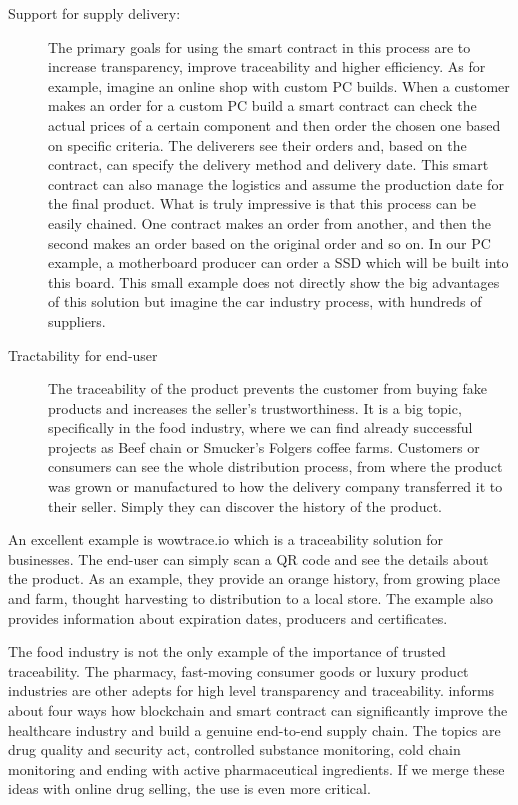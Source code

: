 \documentclass[thesis=M,english]{FITthesis}[2019/12/23]
\begin{document}
\begin{description}

\item[Support for supply delivery:]
The primary goals for using the smart contract in this process are to increase transparency, improve traceability and higher efficiency. As for example, imagine an online shop with custom PC builds. When a customer makes an order for a custom PC build a smart contract can check the actual prices of a certain component and then order the chosen one based on specific criteria. The deliverers see their orders and, based on the contract, can specify the delivery method and delivery date. This smart contract can also manage the logistics and assume the production date for the final product. What is truly impressive is that this process can be easily chained. One contract makes an order from another, and then the second makes an order based on the original order and so on. In our PC example, a motherboard producer can order a SSD which will be built into this board. This small example does not directly show the big advantages of this solution but imagine the car industry process, with hundreds of suppliers.\cite{Angwei2017}

\item[Tractability for end-user]
The traceability of the product prevents the customer from buying fake products and increases the seller's trustworthiness.  It is a big topic, specifically in the food industry, where we can find already successful projects as Beef chain\cite{beefChain} or Smucker’s Folgers coffee farms\cite{CoffeeChain}. Customers or consumers can see the whole distribution process, from where the product was grown or manufactured to how the delivery company transferred it to their seller. Simply they can discover the history of the product.
\end{description}


An excellent example is wowtrace.io\cite{wowtrace} which is a traceability solution for businesses. The end-user can simply scan a QR code and see the details about the product. As an example, they provide an orange history, from growing place and farm, thought harvesting to distribution to a local store. The example also provides information about expiration dates, producers and certificates.

The food industry is not the only example of the importance of trusted traceability. The pharmacy, fast-moving consumer goods or luxury product industries are other adepts for high level transparency and traceability. \cite{healthcareBlockChain} informs about four ways how blockchain and smart contract can significantly improve the healthcare industry and build a genuine end-to-end supply chain. The topics are drug quality and security act, controlled substance monitoring, cold chain monitoring and ending with active pharmaceutical ingredients. If we merge these ideas with online drug selling, the use is even more critical.
\end{document}
